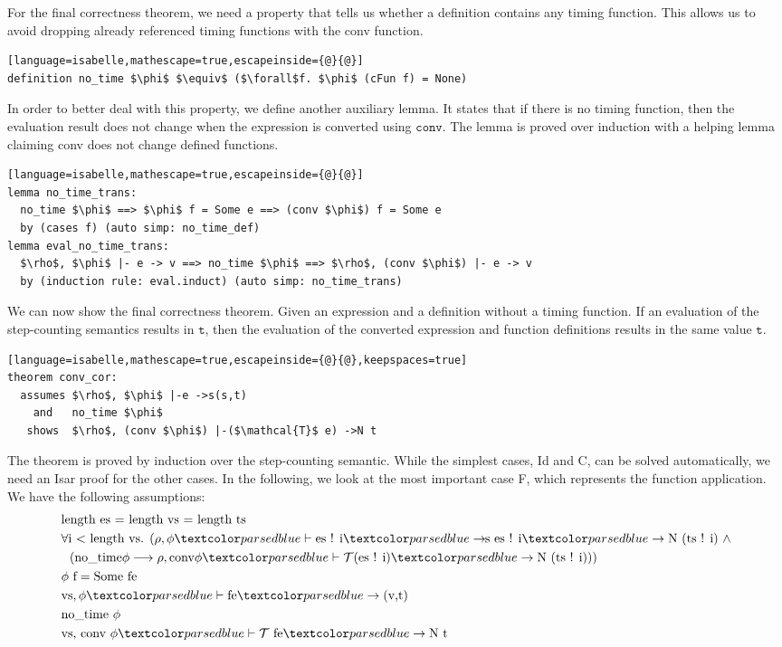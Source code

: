 For the final correctness theorem, we need a property that tells us whether a definition contains any timing function.
This allows us to avoid dropping already referenced timing functions with the conv function.
\begin{lstlisting}[language=isabelle,mathescape=true,escapeinside={@}{@}]
definition no_time $\phi$ $\equiv$ ($\forall$f. $\phi$ (cFun f) = None)
\end{lstlisting}

In order to better deal with this property, we define another auxiliary lemma.
It states that if there is no timing function, then the evaluation result does not change when the expression is converted using $\texttt{conv}$.
The lemma is proved over induction with a helping lemma claiming conv does not change defined functions.
\begin{lstlisting}[language=isabelle,mathescape=true,escapeinside={@}{@}]
lemma no_time_trans:
  no_time $\phi$ ==> $\phi$ f = Some e ==> (conv $\phi$) f = Some e
  by (cases f) (auto simp: no_time_def)
lemma eval_no_time_trans:
  $\rho$, $\phi$ |- e -> v ==> no_time $\phi$ ==> $\rho$, (conv $\phi$) |- e -> v
  by (induction rule: eval.induct) (auto simp: no_time_trans)
\end{lstlisting}

We can now show the final correctness theorem.
Given an expression and a definition without a timing function.
If an evaluation of the step-counting semantics results in $\texttt{t}$, then the evaluation of the converted expression and function definitions results in the same value $\texttt{t}$.
\begin{lstlisting}[language=isabelle,mathescape=true,escapeinside={@}{@},keepspaces=true]
theorem conv_cor:
  assumes $\rho$, $\phi$ |-e ->s(s,t)
    and   no_time $\phi$
   shows  $\rho$, (conv $\phi$) |-($\mathcal{T}$ e) ->N t
\end{lstlisting}

The theorem is proved by induction over the step-counting semantic.
While the simplest cases, Id and C, can be solved automatically, we need an Isar proof for the other cases.
In the following, we look at the most important case F, which represents the function application.
We have the following assumptions:
\begin{align}
  &\text{length es = length vs = length ts} \label{cor:len}\\
  &\forall\text{i < length vs. } (\rho, \phi \hvdash \text{es ! i} \hrightarrows \text{es ! i} \hrightarrow \text{N (ts ! i)}\ \land \label{cor:args}\\
  &\ \ (\text{no\_time} \phi \longrightarrow \rho, \text{conv} \phi \hvdash \mathcal{T} \text{(es ! i)} \hrightarrow \text{N (ts ! i)}))\nonumber\\
  &\phi\ \text{f} = \text{Some fe} \label{cor:phi}\\
  &\text{vs}, \phi \hvdash \text{fe} \hrightarrow \text{(v,t)} \label{cor:feeval}\\
  &\text{no\_time}\ \phi \label{cor:notime}\\
  &\text{vs, conv}\ \phi \hvdash \mathcal{T}\ \text{fe} \hrightarrow \text{N t} \label{cor:Tfeeval}
\end{align}

